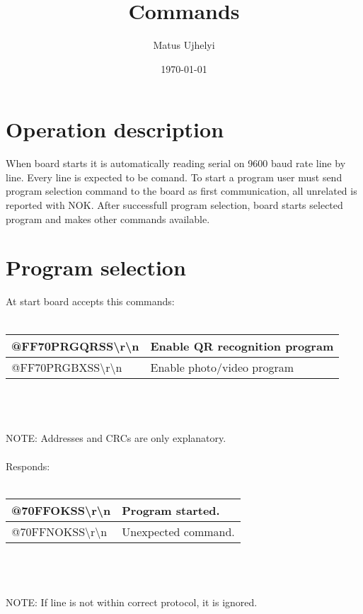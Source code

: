 \documentclass[a4paper,12pt]{article}
\begin{document}
\title{Commands}
\author{Matus Ujhelyi}
\date{\today}
\maketitle
\section{Operation description}
When board starts it is automatically reading serial on 9600 baud rate line by line.
Every line is expected to be comand.
To start a program user must send program selection command to the board as first communication, all unrelated is reported with NOK.
After successfull program selection, board starts selected program and makes other commands available.

\section{Program selection}

At start board accepts this commands: \\
\\
\begin{tabular}{|l|l|}
\hline
@FF70PRGQRSS\textbackslash r\textbackslash n & Enable QR recognition program \\
\hline
@FF70PRGBXSS\textbackslash r\textbackslash n & Enable photo/video program \\
\hline
\end{tabular} \\
\\
\\
NOTE: Addresses and CRCs are only explanatory. \\
\\
Responds: \\
\\
\begin{tabular}{|l|l|}
\hline
 @70FFOKSS\textbackslash r\textbackslash n & Program started. \\
\hline
 @70FFNOKSS\textbackslash r\textbackslash n & Unexpected command. \\
\hline
\end{tabular} \\
\\
\\
NOTE: If line is not within correct protocol, it is ignored. \\
\end{document}
